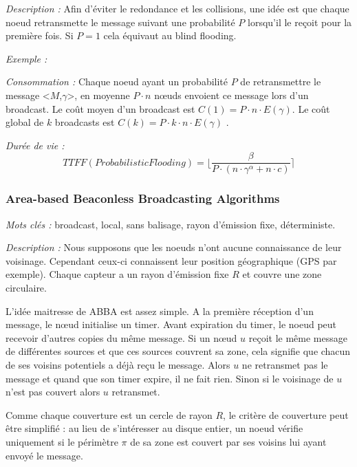 \emph{Description :} Afin d'éviter le redondance et les collisions, une idée est que chaque noeud retransmette le message suivant une probabilité $P$ lorsqu'il le reçoit pour la première fois. Si $P=1$ cela équivaut au blind flooding.


\emph{Exemple :} 

\emph{Consommation :} Chaque noeud ayant un probabilité $P$ de retransmettre le message <$M$,$\gamma$>, en moyenne $P\cdot n$ nœuds envoient ce message lors d'un broadcast.
Le coût moyen d'un broadcast est $C(1) = P\cdot n \cdot E( \gamma ) $. Le coût global de $k$ broadcasts est $C(k) = P\cdot k\cdot n \cdot E( \gamma ) $ .

\emph{Durée de vie :} $$TTFF(Probabilistic Flooding)=\lfloor \frac{\beta}{P \cdot (n\cdot \gamma^\alpha +  n\cdot c)} \rceil$$


\subsubsection{Area-based Beaconless Broadcasting Algorithms \cite{Ovalle2006}}
\emph{Mots clés :} broadcast, local, sans balisage, rayon d'émission fixe, déterministe.

\emph{Description :} Nous supposons que les noeuds n'ont aucune connaissance de leur voisinage. Cependant ceux-ci connaissent leur position géographique (GPS par exemple). Chaque capteur a un rayon d'émission fixe $R$ et couvre une zone circulaire.

L'idée maitresse de ABBA est assez simple. A la première réception d'un message, le nœud initialise un timer. Avant expiration du timer, le noeud peut recevoir d'autres copies du même message. Si un nœud $u$ reçoit le même message de différentes sources et que ces sources couvrent sa zone, cela signifie que chacun de ses voisins potentiels a déjà reçu le message. Alors $u$ ne retransmet pas le message et quand que son timer expire, il ne fait rien. Sinon si le voisinage de $u$ n'est pas couvert alors $u$ retransmet.

Comme chaque couverture est un cercle de rayon $R$, le critère de couverture peut être simplifié : au lieu de s'intéresser au disque entier, un noeud vérifie uniquement si le périmètre $\pi$ de sa zone est couvert par ses voisins lui ayant envoyé le message.


